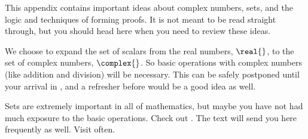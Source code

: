 This appendix contains important ideas about complex numbers, sets, and the logic and techniques of forming proofs.  It is not meant to be read straight through, but you should head here when you need to review these ideas.\par
%
We choose to expand the set of scalars from the real numbers, $\real{\null}$, to the set of complex numbers, $\complex{\null}$.  So basic operations with complex numbers (like addition and division) will be necessary.  This can be safely postponed until your arrival in , and a refresher before  would be a good idea as well.\par
%
Sets are extremely important in all of mathematics, but maybe you have not had much exposure to the basic operations.  Check out .  The text will send you here frequently as well.  Visit often.\par
%

